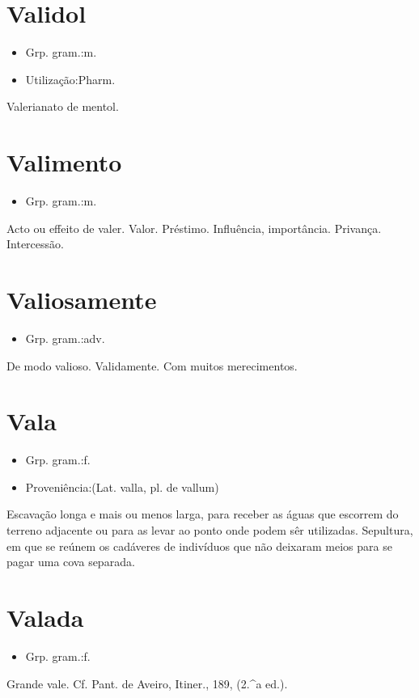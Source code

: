\documentclass{article}
\begin{document}
\section{Validol}
\begin{itemize}
\item {Grp. gram.:m.}
\end{itemize}
\begin{itemize}
\item {Utilização:Pharm.}
\end{itemize}
Valerianato de mentol.
\section{Valimento}
\begin{itemize}
\item {Grp. gram.:m.}
\end{itemize}
Acto ou effeito de valer.
Valor.
Préstimo.
Influência, importância.
Privança.
Intercessão.
\section{Valiosamente}
\begin{itemize}
\item {Grp. gram.:adv.}
\end{itemize}
De modo valioso.
Validamente.
Com muitos merecimentos.
\section{Vala}
\begin{itemize}
\item {Grp. gram.:f.}
\end{itemize}
\begin{itemize}
\item {Proveniência:(Lat. \textunderscore valla\textunderscore , pl. de \textunderscore vallum\textunderscore )}
\end{itemize}
Escavação longa e mais ou menos larga, para receber as águas que escorrem do terreno adjacente ou para as levar ao ponto onde podem sêr utilizadas.
Sepultura, em que se reúnem os cadáveres de indivíduos que não deixaram meios para se pagar uma cova separada.
\section{Valada}
\begin{itemize}
\item {Grp. gram.:f.}
\end{itemize}
Grande vale. Cf. Pant. de Aveiro, \textunderscore Itiner.\textunderscore , 189, (2.^a ed.).
\end{document}

